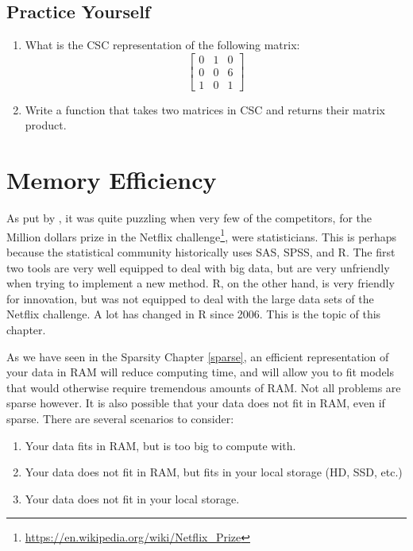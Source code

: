 \documentclass[]{book}
\providecommand{\tightlist}{%
  \setlength{\itemsep}{0pt}\setlength{\parskip}{0pt}}
\renewcommand{\href}[2]{#2\footnote{\url{#1}}}
\theoremstyle{definition}
\theoremstyle{definition}
\theoremstyle{definition}
\theoremstyle{remark}
\begin{document}
\hypertarget{practice-yourself-10}{%
\section{Practice Yourself}\label{practice-yourself-10}}

\begin{enumerate}
\def\labelenumi{\arabic{enumi}.}
\item
  What is the CSC representation of the following matrix:
  \[\begin{bmatrix}
  0 & 1 & 0 \\
  0 & 0 & 6 \\
  1 & 0 & 1 
  \end{bmatrix}\]
\item
  Write a function that takes two matrices in CSC and returns their matrix product.
\end{enumerate}

\hypertarget{memory}{%
\chapter{Memory Efficiency}\label{memory}}

As put by \citet{kane2013scalable}, it was quite puzzling when very few of the competitors, for the Million dollars prize in the \href{https://en.wikipedia.org/wiki/Netflix_Prize}{Netflix challenge}, were statisticians.
This is perhaps because the statistical community historically uses SAS, SPSS, and R.
The first two tools are very well equipped to deal with big data, but are very unfriendly when trying to implement a new method.
R, on the other hand, is very friendly for innovation, but was not equipped to deal with the large data sets of the Netflix challenge.
A lot has changed in R since 2006. This is the topic of this chapter.

As we have seen in the Sparsity Chapter \ref{sparse}, an efficient representation of your data in RAM will reduce computing time, and will allow you to fit models that would otherwise require tremendous amounts of RAM.
Not all problems are sparse however.
It is also possible that your data does not fit in RAM, even if sparse.
There are several scenarios to consider:

\begin{enumerate}
\def\labelenumi{\arabic{enumi}.}
\tightlist
\item
  Your data fits in RAM, but is too big to compute with.
\item
  Your data does not fit in RAM, but fits in your local storage (HD, SSD, etc.)
\item
  Your data does not fit in your local storage.
\end{enumerate}
\end{document}
